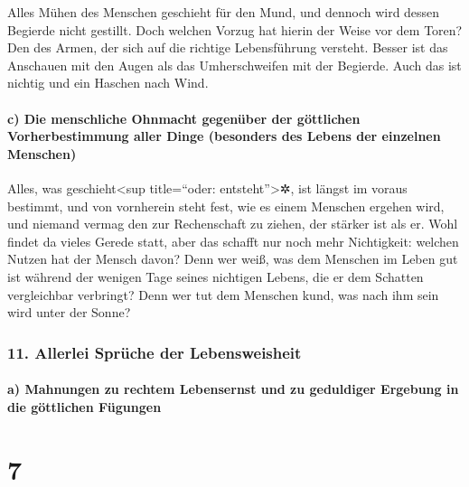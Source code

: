 Alles Mühen des Menschen geschieht für den Mund, und
dennoch wird dessen Begierde nicht gestillt. Doch welchen
Vorzug hat hierin der Weise vor dem Toren? Den des Armen, der sich auf
die richtige Lebensführung versteht. Besser ist das
Anschauen mit den Augen als das Umherschweifen mit der Begierde. Auch
das ist nichtig und ein Haschen nach Wind.

\hypertarget{c-die-menschliche-ohnmacht-gegenuxfcber-der-guxf6ttlichen-vorherbestimmung-aller-dinge-besonders-des-lebens-der-einzelnen-menschen}{%
\paragraph{c) Die menschliche Ohnmacht gegenüber der göttlichen
Vorherbestimmung aller Dinge (besonders des Lebens der einzelnen
Menschen)}\label{c-die-menschliche-ohnmacht-gegenuxfcber-der-guxf6ttlichen-vorherbestimmung-aller-dinge-besonders-des-lebens-der-einzelnen-menschen}}

Alles, was geschieht\textless sup title=``oder:
entsteht''\textgreater✲, ist längst im voraus bestimmt, und von
vornherein steht fest, wie es einem Menschen ergehen wird, und niemand
vermag den zur Rechenschaft zu ziehen, der stärker ist als er.
Wohl findet da vieles Gerede statt, aber das schafft nur
noch mehr Nichtigkeit: welchen Nutzen hat der Mensch davon?
Denn wer weiß, was dem Menschen im Leben gut ist während
der wenigen Tage seines nichtigen Lebens, die er dem Schatten
vergleichbar verbringt? Denn wer tut dem Menschen kund, was nach ihm
sein wird unter der Sonne?

\hypertarget{allerlei-spruxfcche-der-lebensweisheit}{%
\subsubsection{11. Allerlei Sprüche der
Lebensweisheit}\label{allerlei-spruxfcche-der-lebensweisheit}}

\hypertarget{a-mahnungen-zu-rechtem-lebensernst-und-zu-geduldiger-ergebung-in-die-guxf6ttlichen-fuxfcgungen}{%
\paragraph{a) Mahnungen zu rechtem Lebensernst und zu geduldiger
Ergebung in die göttlichen
Fügungen}\label{a-mahnungen-zu-rechtem-lebensernst-und-zu-geduldiger-ergebung-in-die-guxf6ttlichen-fuxfcgungen}}

\hypertarget{section-6}{%
\section{7}\label{section-6}}

